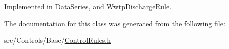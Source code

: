Implemented in \mbox{\hyperlink{classDataSeries_a16a0aab69c764944dbb4a55b7432f37b_a16a0aab69c764944dbb4a55b7432f37b}{Data\+Series}}, and \mbox{\hyperlink{classWwtpDischargeRule_a8eade5d595ec0fdc76769e67c7ffc5f4_a8eade5d595ec0fdc76769e67c7ffc5f4}{Wwtp\+Discharge\+Rule}}.



The documentation for this class was generated from the following file\+:\begin{DoxyCompactItemize}
\item 
src/\+Controls/\+Base/\mbox{\hyperlink{ControlRules_8h}{Control\+Rules.\+h}}\end{DoxyCompactItemize}
